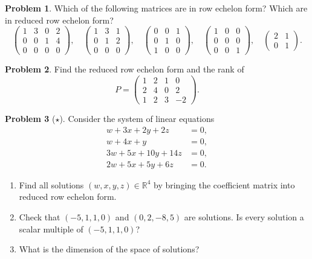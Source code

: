 \documentclass[11pt]{article}
\theoremstyle{definition}
\newtheorem{problem}{Problem}[section]
\begin{document}
\begin{problem}\label{pr:ref}
    Which of the following matrices are in row echelon form? Which are in reduced row echelon form?
    \[\begin{pmatrix} 1 & 3 & 0 & 2 \\ 0 & 0 & 1 & 4 \\ 0 & 0 & 0 & 0 \end{pmatrix}, \quad \begin{pmatrix} 1 & 3 & 1 \\ 0 & 1 & 2 \\ 0 & 0 & 0 \end{pmatrix}, \quad \begin{pmatrix} 0 & 0 & 1 \\ 0 & 1 & 0 \\ 1 & 0 & 0 \end{pmatrix}, \quad \begin{pmatrix} 1 & 0 & 0 \\ 0 & 0 & 0 \\ 0 & 0 & 1 \end{pmatrix}, \quad \begin{pmatrix} 2 & 1 \\ 0 & 1 \end{pmatrix}.\]
\end{problem}

\begin{problem}\label{pr:rref-compute}
    Find the reduced row echelon form and the rank of
    \[P = \begin{pmatrix} 1 & 2 & 1 & 0 \\ 2 & 4 & 0 & 2 \\ 1 & 2 & 3 & -2 \end{pmatrix}.\]
\end{problem}

\begin{problem}[$\star$]\label{pr:system}
    Consider the system of linear equations
    \begin{align*}
        w + 3x + 2y + 2z &= 0, \\
        w + 4x + y &= 0, \\
        3w + 5x + 10y + 14z &= 0, \\
        2w + 5x + 5y + 6z &= 0.
    \end{align*}
    \begin{enumerate}[label=(\alph*)]
        \item Find all solutions $(w, x, y, z) \in \mathbb{R}^4$ by bringing the coefficient matrix into reduced row echelon form.
        \item Check that $(-5, 1, 1, 0)$ and $(0, 2, -8, 5)$ are solutions. Is every solution a scalar multiple of $(-5, 1, 1, 0)$?
        \item What is the dimension of the space of solutions?
    \end{enumerate}
\end{problem}
\end{document}
